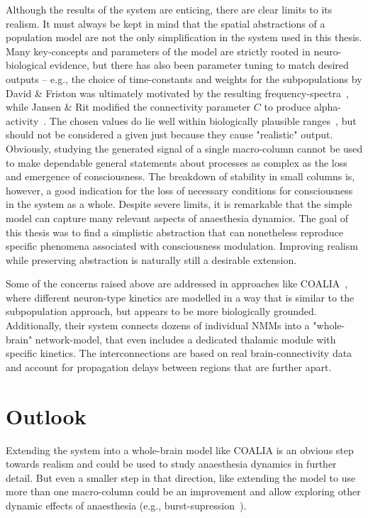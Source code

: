 Although the results of the system are enticing,
there are clear limits to its realism.
It must always be kept in mind that the spatial abstractions of a
population model are not the only simplification in the system used in this thesis.
Many key-concepts and parameters of the model are strictly rooted in neuro-biological evidence,
but there has also been parameter tuning to match desired outputs -- e.g., the choice of time-constants and weights for
the subpopulations by David \& Friston was ultimately motivated by the
resulting frequency-spectra~\cite{david_neural_2003},
while Jansen \& Rit modified the connectivity parameter $C$ to produce
alpha-activity~\cite{jansen_electroencephalogram_1995}.
The chosen values do lie well within biologically plausible ranges~\cite{gulledge_synaptic_2005},
but should not be considered a given just because they cause "realistic" output.
Obviously, studying the generated signal of a single macro-column cannot be used to make dependable
general statements about processes as complex as the loss and emergence of consciousness.
The breakdown of stability in small columns is, however, a good indication for the loss of necessary
conditions for consciousness in the system as a whole.
Despite severe limits,
it is remarkable that the simple model can capture many relevant aspects of anaesthesia dynamics.
The goal of this thesis was to find a simplistic abstraction that can nonetheless reproduce specific phenomena
associated with consciousness modulation.
Improving realism while preserving abstraction is naturally still a desirable extension.

Some of the concerns raised above are addressed in approaches like COALIA~\cite{bensaid_coalia_2019},
where different neuron-type kinetics are modelled in a way that is similar to the subpopulation approach,
but appears to be more biologically grounded.
Additionally, their system connects dozens of individual NMMs into a "whole-brain" network-model,
that even includes a dedicated thalamic module with specific kinetics.
The interconnections are based on real brain-connectivity data and account for propagation delays
between regions that are further apart.

\section{Outlook}
Extending the system into a whole-brain model like COALIA is an obvious step towards realism and could be used to
study anaesthesia dynamics in further detail.
But even a smaller step in that direction,
like extending the model to use more than one macro-column could be an improvement and allow exploring other
dynamic effects of anaesthesia (e.g., burst-supression~\cite{bojak_emergence_2015}).

